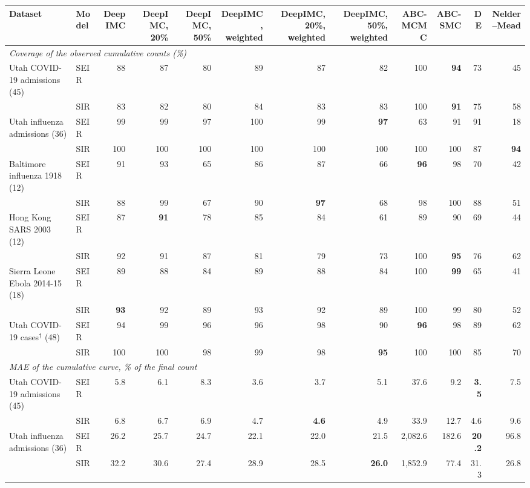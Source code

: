 \begin{tabular}{llrrrrrrrrrr}
\toprule
Dataset & Model & DeepIMC & DeepIMC, 20\% & DeepIMC, 50\% & DeepIMC, weighted & DeepIMC, 20\%, weighted & DeepIMC, 50\%, weighted & ABC-MCMC & ABC-SMC & DE & Nelder--Mead \\
\midrule
\multicolumn{12}{l}{\textit{Coverage of the observed cumulative counts (\%)}} \\
Utah COVID-19 admissions (45) & SEIR & 88 & 87 & 80 & 89 & 87 & 82 & 100 & \textbf{94} & 73 & 45 \\
 & SIR & 83 & 82 & 80 & 84 & 83 & 83 & 100 & \textbf{91} & 75 & 58 \\
Utah influenza admissions (36) & SEIR & 99 & 99 & 97 & 100 & 99 & \textbf{97} & 63 & 91 & 91 & 18 \\
 & SIR & 100 & 100 & 100 & 100 & 100 & 100 & 100 & 100 & 87 & \textbf{94} \\
Baltimore influenza 1918 (12) & SEIR & 91 & 93 & 65 & 86 & 87 & 66 & \textbf{96} & 98 & 70 & 42 \\
 & SIR & 88 & 99 & 67 & 90 & \textbf{97} & 68 & 98 & 100 & 88 & 51 \\
Hong Kong SARS 2003 (12) & SEIR & 87 & \textbf{91} & 78 & 85 & 84 & 61 & 89 & 90 & 69 & 44 \\
 & SIR & 92 & 91 & 87 & 81 & 79 & 73 & 100 & \textbf{95} & 76 & 62 \\
Sierra Leone Ebola 2014-15 (18) & SEIR & 89 & 88 & 84 & 89 & 88 & 84 & 100 & \textbf{99} & 65 & 41 \\
 & SIR & \textbf{93} & 92 & 89 & 93 & 92 & 89 & 100 & 99 & 80 & 52 \\
Utah COVID-19 cases$^\dagger$ (48) & SEIR & 94 & 99 & 96 & 96 & 98 & 90 & \textbf{96} & 98 & 89 & 62 \\
 & SIR & 100 & 100 & 98 & 99 & 98 & \textbf{95} & 100 & 100 & 85 & 70 \\
\midrule
\multicolumn{12}{l}{\textit{MAE of the cumulative curve, \% of the final count}} \\
Utah COVID-19 admissions (45) & SEIR & 5.8 & 6.1 & 8.3 & 3.6 & 3.7 & 5.1 & 37.6 & 9.2 & \textbf{3.5} & 7.5 \\
 & SIR & 6.8 & 6.7 & 6.9 & 4.7 & \textbf{4.6} & 4.9 & 33.9 & 12.7 & 4.6 & 9.6 \\
Utah influenza admissions (36) & SEIR & 26.2 & 25.7 & 24.7 & 22.1 & 22.0 & 21.5 & 2,082.6 & 182.6 & \textbf{20.2} & 96.8 \\
 & SIR & 32.2 & 30.6 & 27.4 & 28.9 & 28.5 & \textbf{26.0} & 1,852.9 & 77.4 & 31.3 & 26.8 \\

\end{tabular}
